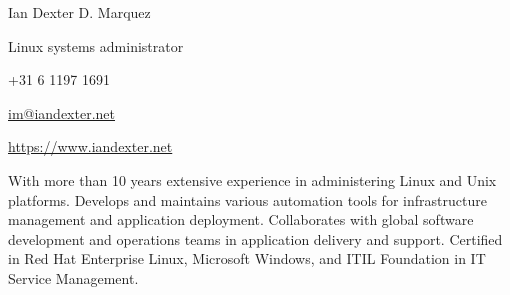 \documentclass[10pt, a4paper, final]{article}
\begin{document}
\begin{minipage}[c]{0.5\textwidth}
  \begin{flushleft}\begin{spacing}{1}
    \Huge Ian Dexter D. Marquez

    \Large Linux systems administrator
  \end{spacing}\end{flushleft}
\end{minipage}
\begin{minipage}[c]{0.5\textwidth}
  \begin{flushright}\begin{spacing}{1}\small
    +31 6 1197 1691 

    \href{mailto:im@iandexter.net}{im@iandexter.net} 

    \href{https://www.iandexter.net}{https://www.iandexter.net} 
  \end{spacing}\end{flushright}
\end{minipage}
\vspace{1em}
\hrulefill

With more than 10 years extensive experience in administering Linux and Unix platforms. Develops and maintains various automation tools for infrastructure management and application deployment. Collaborates with global software development and operations teams in application delivery and support. Certified in Red Hat Enterprise Linux, Microsoft Windows, and ITIL Foundation in IT Service Management.

\vspace{1.5em}
\end{document}
